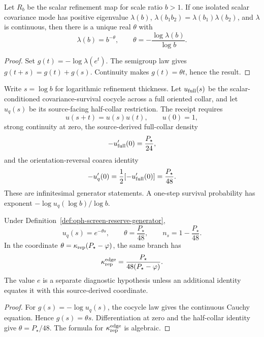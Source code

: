 \begin{theorem}\label{thm:oph-screen-tilt}
Let \(R_b\) be the scalar refinement map for scale ratio \(b>1\).  If one isolated scalar
covariance mode has positive eigenvalue \(\lambda(b)\), \(\lambda(b_1b_2)=\lambda(b_1)\lambda(b_2)\),
and \(\lambda\) is continuous, then there is a unique real \(\theta\) with
\[
  \lambda(b)=b^{-\theta},\qquad
  \theta=-\frac{\log\lambda(b)}{\log b}.
\]
\end{theorem}

\begin{proof}
Set \(g(t)=-\log\lambda(e^t)\).  The semigroup law gives \(g(t+s)=g(t)+g(s)\).  Continuity makes
\(g(t)=\theta t\), hence the result.
\end{proof}

\begin{definition}\label{def:oph-screen-reserve-generator}
Write \(s=\log b\) for logarithmic refinement thickness.  Let \(u_{\rm full}(s)\) be the
scalar-conditioned covariance-survival cocycle across a full oriented collar, and let \(u_q(s)\)
be its source-facing half-collar restriction.  The receipt requires
\[
u(s+t)=u(s)u(t),\qquad u(0)=1,
\]
strong continuity at zero, the source-derived full-collar density
\[
-u'_{\rm full}(0)=\frac{P_\star}{24},
\]
and the orientation-reversal coarea identity
\[
-u'_q(0)=\frac12[-u'_{\rm full}(0)]=\frac{P_\star}{48}.
\]
These are infinitesimal generator statements.  A one-step survival probability has exponent
\(-\log u_q(\log b)/\log b\).
\end{definition}

\begin{theorem}
\label{thm:oph-p-over-48-tilt}
Under Definition~\ref{def:oph-screen-reserve-generator},
\[
u_q(s)=e^{-\theta s},\qquad
\theta=\frac{P_\star}{48},\qquad
n_s=1-\frac{P_\star}{48}.
\]
In the coordinate \(\theta=\kappa_{\rm rep}(P_\star-\varphi)\), the same branch has
\[
\kappa_{\rm rep}^{\rm edge}
=\frac{P_\star}{48(P_\star-\varphi)}.
\]
The value \(e\) is a separate diagnostic hypothesis unless an additional identity equates it
with this source-derived coordinate.
\end{theorem}

\begin{proof}
For \(g(s)=-\log u_q(s)\), the cocycle law gives the continuous Cauchy equation.  Hence
\(g(s)=\theta s\).  Differentiation at zero and the half-collar identity give
\(\theta=P_\star/48\).  The formula for \(\kappa_{\rm rep}^{\rm edge}\) is algebraic.
\end{proof}

